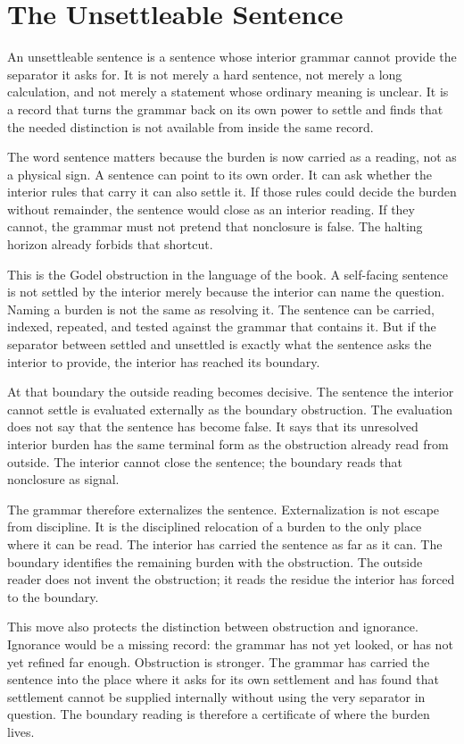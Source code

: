 \section{The Unsettleable Sentence}

An unsettleable sentence is a sentence whose interior grammar cannot provide
the separator it asks for. It is not merely a hard sentence, not merely a
long calculation, and not merely a statement whose ordinary meaning is
unclear. It is a record that turns the grammar back on its own power to
settle and finds that the needed distinction is not available from inside the
same record.

The word sentence matters because the burden is now carried as a reading, not
as a physical sign. A sentence can point to its own order. It can ask whether
the interior rules that carry it can also settle it. If those rules could
decide the burden without remainder, the sentence would close as an interior
reading. If they cannot, the grammar must not pretend that nonclosure is
false. The halting horizon already forbids that shortcut.

This is the Godel obstruction in the language of the book. A self-facing
sentence is not settled by the interior merely because the interior can name
the question. Naming a burden is not the same as resolving it. The sentence
can be carried, indexed, repeated, and tested against the grammar that
contains it. But if the separator between settled and unsettled is exactly
what the sentence asks the interior to provide, the interior has reached its
boundary.

At that boundary the outside reading becomes decisive. The sentence the
interior cannot settle is evaluated externally as the boundary obstruction.
The evaluation does not say that the sentence has become false. It says that
its unresolved interior burden has the same terminal form as the obstruction
already read from outside. The interior cannot close the sentence; the
boundary reads that nonclosure as signal.

The grammar therefore externalizes the sentence. Externalization is not
escape from discipline. It is the disciplined relocation of a burden to the
only place where it can be read. The interior has carried the sentence as
far as it can. The boundary identifies the remaining burden with the
obstruction. The outside reader does not invent the obstruction; it reads the
residue the interior has forced to the boundary.

This move also protects the distinction between obstruction and ignorance.
Ignorance would be a missing record: the grammar has not yet looked, or has
not yet refined far enough. Obstruction is stronger. The grammar has carried
the sentence into the place where it asks for its own settlement and has
found that settlement cannot be supplied internally without using the very
separator in question. The boundary reading is therefore a certificate of
where the burden lives.

